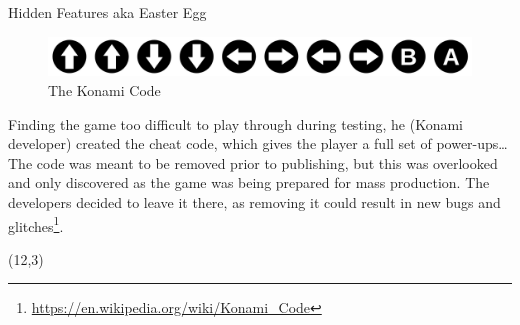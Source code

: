 \documentclass{beamer}
\begin{document}
\begin{frame}{Hidden Features aka Easter Egg}
    \begin{figure}
    \begin{center}
        \includegraphics[width=.5\textwidth]{images/1280px-Konami_Code.svg.png}
    \end{center}
    \caption{The Konami Code}
    \label{fig:konami}
    \end{figure}

    \pause
    Finding the game too difficult to play through during testing, he (Konami developer) created the cheat code, which gives the player a full set of power-ups\ldots The code was meant to be removed prior to publishing, but this was overlooked and only discovered as the game was being prepared for mass production. The developers decided to leave it there, as removing it could result in new bugs and glitches\footnote{\url{https://en.wikipedia.org/wiki/Konami_Code}}. 
    \begin{textblock}{3}(12,3)
    \end{textblock}
\end{frame}
\end{document}

